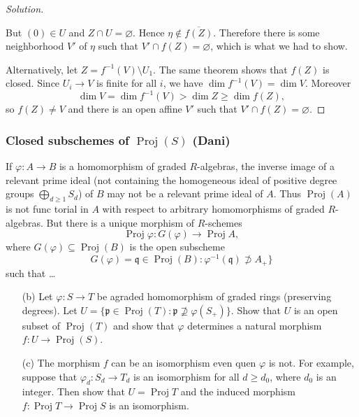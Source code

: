 \begin{proof}[Solution]
\begin{thm}[Cohen]\leavevmode
	
\end{thm}

But $(0) \in U$ and $Z \cap U = \varnothing$. Hence $\eta \not \in \overline{f(Z)}$.
Therefore there is some neighborhood $V'$ of $\eta$ such that $V' \cap f(Z) = \varnothing$, which is what we had to show.

Alternatively, let $Z = f^{-1}(V) \setminus U_1$. The same theorem shows that $f(Z)$ is closed. Since $U_i \to V$ is finite for all $i$, we have $\dim f^{-1}(V) = \dim V$. Moreover
\begin{equation*}
	\dim V = \dim f^{-1}(V) > \dim Z \geq \dim f(Z),
\end{equation*}
so $f(Z) \ne V$ and there is an open affine $V'$ such that $V' \cap f(Z) = \varnothing$.
\end{proof}

\subsubsection{Closed subschemes of $\operatorname{Proj}(S)$ (Dani)}

\begin{remark}
	If $\varphi:A\to B$ is a homomorphism of graded $R$-algebras, the inverse image of a relevant prime ideal (not containing the homogeneous ideal of positive degree groups $\bigoplus_{d\geq 1} S_d $) of $B$ may not be a relevant prime ideal of $A$. Thus $\operatorname{Proj}(A)$ is not func torial in $A$ with respect to arbitrary homomorphisms of graded $R$-algebras. But there is a unique morphism of $R$-schemes
	\[\operatorname{Proj}\varphi:G(\varphi)\longrightarrow \operatorname{Proj}A,\]
	where $G(\varphi )\subseteq \operatorname{Proj}(B)$ is the open subscheme
	\[G(\varphi )=\mathfrak{q}\in\operatorname{Proj}(B):\varphi^{-1}(\mathfrak{q})\not\supset A_+\}\]
such that …
\end{remark}

\begin{manualexercise}{2.14}\leavevmode 
	\begin{enumerate}
		\item[(b)] Let $\varphi:S\to T$ be agraded homomorphism of graded rings (preserving degrees). Let $U=\{\mathfrak{p}\in\operatorname{Proj}(T):\mathfrak{p}\not\supseteq\varphi(S_+)\}$. Show that $U$ is an open subset of $\operatorname{Proj}(T)$ and show that $\varphi$ determines a natural morphism $f: U\to \operatorname{Proj}(S)$.
	
		\item[(c)] The morphism $f$ can be an isomorphism even quen $\varphi$ is not. For example, suppose that $\varphi_d:S_d\to T_d$ is an isomorphism for all $d\geq d_0$, where $d_0$ is an integer. Then show that $U=\operatorname{Proj}T$ and the induced morphism $f:\operatorname{Proj}T\to  \operatorname{Proj}S$ is an isomorphism.
	\end{enumerate}
\end{manualexercise}

